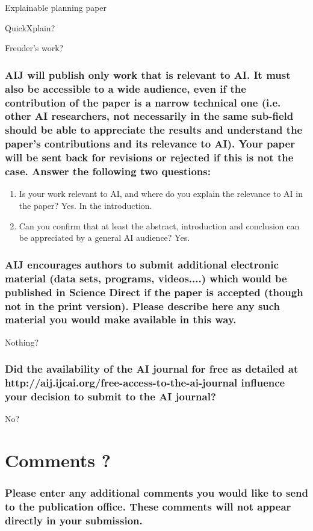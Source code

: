 \documentclass{article}
\begin{document}
Explainable planning paper

QuickXplain? 

Freuder's work?




\subsubsection*{AIJ will publish only work that is relevant to AI. It must also be accessible to a wide audience, even if the contribution of the paper is a narrow technical one (i.e. other AI researchers, not necessarily in the same sub-field should be able to appreciate the results and understand the paper's contributions and its relevance to AI). Your paper will be sent back for revisions or rejected if this is not the case. Answer the following two questions:}

\begin{enumerate}
    \item Is your work relevant to AI, and where do you explain the relevance to AI in the paper? Yes. In the introduction. 
    \item Can you confirm that at least the abstract, introduction and conclusion can be appreciated by a general AI audience? Yes. 
\end{enumerate}


\subsubsection*{AIJ encourages authors to submit additional electronic material (data sets, programs, videos....) which would be published in Science Direct if the paper is accepted (though not in the print version). Please describe here any such material you would make available in this way.}

Nothing? 

\subsubsection*{Did the availability of the AI journal for free as detailed at http://aij.ijcai.org/free-access-to-the-ai-journal influence your decision to submit to the AI journal?}

No?

\section*{Comments ? }
\subsubsection*{ Please enter any additional comments you would like to send to the publication office. These comments will not appear directly in your submission. }
\end{document}
